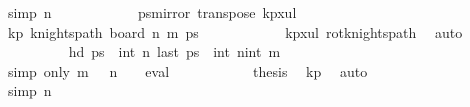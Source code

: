\begin{isabellebody}
\ {\isacharbrackleft}{\kern0pt}simp{\isacharbrackright}{\kern0pt}{\isacharcolon}{\kern0pt}\ {\isachardoublequoteopen}n\ {\isacharequal}{\kern0pt}\ {}{\isachardoublequoteclose}\isanewline
\ \ \ \ \ \ \ \ \isamarkupfalse%
\ {\isacharquery}{\kern0pt}ps{\isacharequal}{\kern0pt}{\isachardoublequoteopen}mirror{}\ {\isacharparenleft}{\kern0pt}transpose\ kp{}x{}ul{\isacharparenright}{\kern0pt}{\isachardoublequoteclose}\isanewline
\ \ \ \ \ \ \ \ \isamarkupfalse%
\ kp{\isacharcolon}{\kern0pt}\ {\isachardoublequoteopen}knights{\isacharunderscore}{\kern0pt}path\ {\isacharparenleft}{\kern0pt}board\ n\ m{\isacharparenright}{\kern0pt}\ {\isacharquery}{\kern0pt}ps{\isachardoublequoteclose}\isanewline
\ \ \ \ \ \ \ \ \ \ \isamarkupfalse%
\ kp{\isacharunderscore}{\kern0pt}{}x{}{\isacharunderscore}{\kern0pt}ul\ rot{}{}{\isacharunderscore}{\kern0pt}knights{\isacharunderscore}{\kern0pt}path\ \isamarkupfalse%
\ auto\isanewline
\ \ \ \ \ \ \ \ \isamarkupfalse%
\ {\isachardoublequoteopen}hd\ {\isacharquery}{\kern0pt}ps\ {\isacharequal}{\kern0pt}\ {\isacharparenleft}{\kern0pt}int\ n{\isacharcomma}{\kern0pt}{}{\isacharparenright}{\kern0pt}{\isachardoublequoteclose}\ {\isachardoublequoteopen}last\ {\isacharquery}{\kern0pt}ps\ {\isacharequal}{\kern0pt}\ {\isacharparenleft}{\kern0pt}int\ n{\isacharminus}{\kern0pt}{}{\isacharcomma}{\kern0pt}int\ m{\isacharminus}{\kern0pt}{}{\isacharparenright}{\kern0pt}{\isachardoublequoteclose}\isanewline
\ \ \ \ \ \ \ \ \ \ \isamarkupfalse%
\ {\isacharparenleft}{\kern0pt}simp\ only{\isacharcolon}{\kern0pt}\ {\isacartoucheopen}m\ {\isacharequal}{\kern0pt}\ {}{\isacartoucheclose}\ {\isacartoucheopen}n\ {\isacharequal}{\kern0pt}\ {}{\isacartoucheclose}\ {\isacharbar}{\kern0pt}\ eval{\isacharparenright}{\kern0pt}{\isacharplus}{\kern0pt}\isanewline
\ \ \ \ \ \ \ \ \isamarkupfalse%
\ \isamarkupfalse%
\ {\isacharquery}{\kern0pt}thesis\ \isamarkupfalse%
\ kp\ \isamarkupfalse%
\ auto\isanewline
\ \ \ \ \ \ \isamarkupfalse%
\isanewline
\ \ \ \ \ \ \ \ \isamarkupfalse%
\ {\isacharbrackleft}{\kern0pt}simp{\isacharbrackright}{\kern0pt}{\isacharcolon}{\kern0pt}\ {\isachardoublequoteopen}n\ {\isacharequal}{\kern0pt}\ {}{\isachardoublequoteclose}\isanewline
\ \ \ \ \ \ \ \ \isamarkupfalse%

\end{isabellebody}
